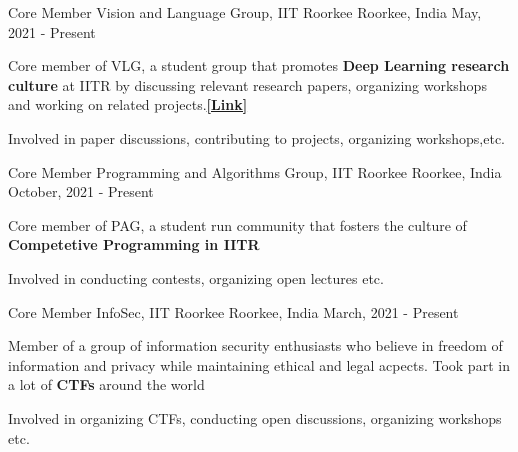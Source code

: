 

\begin{cventries}

  \cventry
    {Core Member} %
    {Vision and Language Group, IIT Roorkee} %
    {Roorkee, India} %
    {May, 2021 - Present} %
    {
      \begin{cvitems} %
        \item {Core member of VLG, a student group that promotes \textbf{Deep Learning research culture} at IITR by discussing relevant research papers, organizing workshops and working on related projects.\href{https://vlgiitr.github.io/}{\bf [Link]}}
        \item {Involved in paper discussions, contributing to projects, organizing workshops,etc.}
      \end{cvitems}
    }

  \cventry
	{Core Member} %
	{Programming and Algorithms Group, IIT Roorkee} %
	{Roorkee, India} %
	{October, 2021 - Present} %
	{
		\begin{cvitems} %
			\item {Core member of PAG, a student run community that fosters the culture of \textbf{Competetive Programming in IITR}}
			\item {Involved in conducting contests, organizing open lectures etc.}
		\end{cvitems}
	}

  \cventry
	{Core Member} %
	{InfoSec, IIT Roorkee} %
	{Roorkee, India} %
	{March, 2021 - Present} %
	{
		\begin{cvitems} %
			\item {Member of a group of information security enthusiasts who believe in freedom of information and privacy while maintaining ethical and legal acpects. Took part in a lot of \textbf{CTFs} around the world}
			\item {Involved in organizing CTFs, conducting open discussions, organizing workshops etc.}
		\end{cvitems}
	}


\end{cventries}
